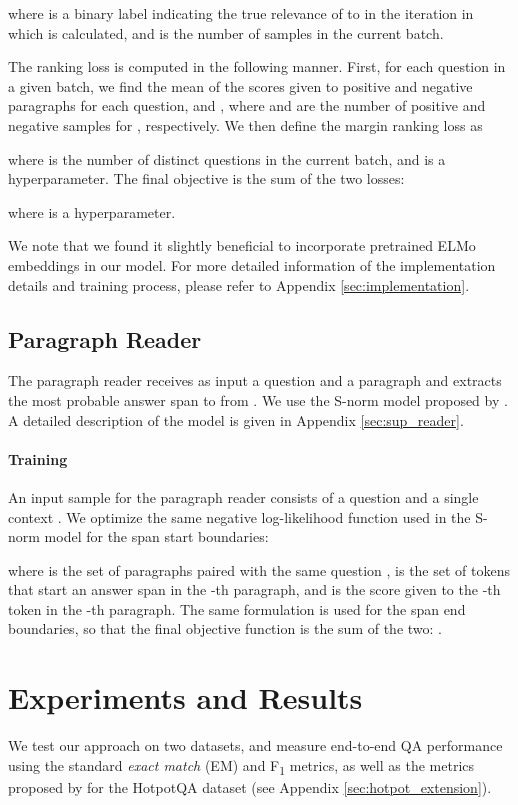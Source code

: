 \documentclass[11pt,a4paper,dvipsnames]{article}
\newcommand\fone{F\textsubscript{1} }
\begin{document}
where  is a binary label indicating the true relevance of  to  in the iteration in which  is calculated, and  is the number of samples in the current batch. \par
The ranking loss is computed in the following manner. First, for each question  in a given batch, we find the mean of the scores given to positive and negative paragraphs for each question,  and , where  and  are the number of positive and negative samples for , respectively. We then define the margin ranking loss \citep{socher2013marginLoss} as

where  is the number of distinct questions in the current batch, and  is a hyperparameter. The final objective is the sum of the two losses:

where  is a hyperparameter. \par
We note that we found it slightly beneficial to incorporate pretrained ELMo \citep{Peters2018elmo} embeddings in our model.
For more detailed information of the implementation details and training process, please refer to Appendix \ref{sec:implementation}.

\subsection{Paragraph Reader} \label{reader}
The paragraph reader receives as input a question  and a paragraph  and extracts the most probable answer span to  from .
We use the S-norm model proposed by \citet{GardnerC18snorm}. A detailed description of the model is given in Appendix \ref{sec:sup_reader}.

\paragraph{Training}
An input sample for the paragraph reader consists of a question and a single context . 
We optimize the same negative log-likelihood function used in the S-norm model for the span start boundaries:

where  is the set of paragraphs paired with the same question ,  is the set of tokens that start an answer span in the -th paragraph, and  is the score given to the -th token in the -th paragraph. The same formulation is used for the span end boundaries, so that the final objective function is the sum of the two: . \par

\section{Experiments and Results}
We test our approach on two datasets, and measure end-to-end QA performance using the standard \emph{exact match} (EM) and \fone metrics, as well as the metrics proposed by \citet{Yang0ZBCSM18hotpot} for the HotpotQA dataset (see Appendix \ref{sec:hotpot_extension}).
\end{document}
